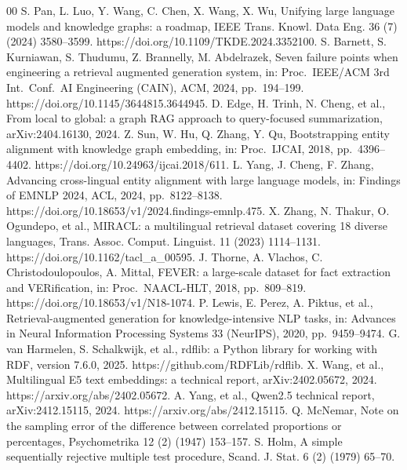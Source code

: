 \documentclass[a4paper,fleqn]{cas-dc}
\begin{document}
\begin{thebibliography}{00}
S. Pan, L. Luo, Y. Wang, C. Chen, X. Wang, X. Wu, Unifying large language
models and knowledge graphs: a roadmap, IEEE Trans. Knowl. Data Eng. 36 (7)
(2024) 3580--3599. https://doi.org/10.1109/TKDE.2024.3352100.
S. Barnett, S. Kurniawan, S. Thudumu, Z. Brannelly, M. Abdelrazek, Seven
failure points when engineering a retrieval augmented generation system, in:
Proc.\ IEEE/ACM 3rd Int.\ Conf.\ AI Engineering (CAIN), ACM, 2024, pp.\ 194--199.
https://doi.org/10.1145/3644815.3644945.
D. Edge, H. Trinh, N. Cheng, et al., From local to global: a graph RAG approach
to query-focused summarization, arXiv:2404.16130, 2024.
Z. Sun, W. Hu, Q. Zhang, Y. Qu, Bootstrapping entity alignment with knowledge
graph embedding, in: Proc.\ IJCAI, 2018, pp.\ 4396--4402.
https://doi.org/10.24963/ijcai.2018/611.
L. Yang, J. Cheng, F. Zhang, Advancing cross-lingual entity alignment with
large language models, in: Findings of EMNLP 2024, ACL, 2024, pp.\ 8122--8138.
https://doi.org/10.18653/v1/2024.findings-emnlp.475.
X. Zhang, N. Thakur, O. Ogundepo, et al., MIRACL: a multilingual retrieval
dataset covering 18 diverse languages, Trans. Assoc. Comput. Linguist. 11
(2023) 1114--1131. https://doi.org/10.1162/tacl\_a\_00595.
J. Thorne, A. Vlachos, C. Christodoulopoulos, A. Mittal, FEVER: a large-scale
dataset for fact extraction and VERification, in: Proc.\ NAACL-HLT, 2018,
pp.\ 809--819. https://doi.org/10.18653/v1/N18-1074.
P. Lewis, E. Perez, A. Piktus, et al., Retrieval-augmented generation for
knowledge-intensive NLP tasks, in: Advances in Neural Information Processing
Systems 33 (NeurIPS), 2020, pp.\ 9459--9474.
G. van Harmelen, S. Schalkwijk, et al., rdflib: a Python library for working
with RDF, version 7.6.0, 2025. https://github.com/RDFLib/rdflib.
X. Wang, et al., Multilingual E5 text embeddings: a technical report,
arXiv:2402.05672, 2024. https://arxiv.org/abs/2402.05672.
A. Yang, et al., Qwen2.5 technical report, arXiv:2412.15115, 2024.
https://arxiv.org/abs/2412.15115.
Q. McNemar, Note on the sampling error of the difference between correlated
proportions or percentages, Psychometrika 12 (2) (1947) 153--157.
S. Holm, A simple sequentially rejective multiple test procedure, Scand. J.
Stat. 6 (2) (1979) 65--70.
\end{thebibliography}
\end{document}
